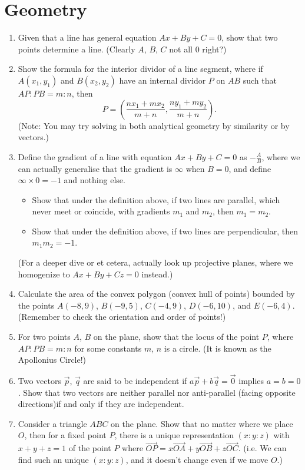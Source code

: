 \documentclass{article}
\begin{document}
\section{Geometry}
\begin{enumerate}
\item Given that a line has general equation $Ax+By+C=0$, show that two points determine a line. (Clearly $A$, $B$, $C$ not all $0$ right?)
\item Show the formula for the interior dividor of a line segment, where if $A(x_1,y_1)$ and $B(x_2,y_2)$ have an internal dividor $P$ on $AB$ such that $AP:PB=m:n$, then \[P=(\frac{nx_1+mx_2}{m+n},\frac{ny_1+my_2}{m+n}).\](Note: You may try solving in both analytical geometry by similarity or by vectors.)
\newpage\noindent
\item Define the gradient of a line with equation $Ax+By+C=0$ as $-\frac{A}{B}$, where we can actually generalise that the gradient is $\infty$ when $B=0$, and define $\infty\times 0=-1$ and nothing else.
       \begin{itemize}
              \item[(a)] Show that under the definition above, if two lines are parallel, which never meet or coincide, with gradients $m_1$ and $m_2$, then $m_1=m_2$.
              \item[(b)] Show that under the definition above, if two lines are perpendicular, then $m_1m_2=-1$.
       \end{itemize} 
(For a deeper dive or et cetera, actually look up projective planes, where we homogenize to $Ax+By+Cz=0$ instead.)
\item Calculate the area of the convex polygon (convex hull of points) bounded by the points $A(-8,9)$, $B(-9,5)$, $C(-4,9)$, $D(-6,10)$, and $E(-6,4)$. (Remember to check the orientation and order of points!)
\item For two points $A$, $B$ on the plane, show that the locus of the point $P$, where $AP:PB=m:n$ for some constants $m$, $n$ is a circle. (It is known as the Apollonius Circle!)
\item Two vectors $\vec{p}$, $\vec{q}$ are said to be independent if $a\vec{p}+b\vec{q}=\vec{0}$ implies $a=b=0$. Show that two vectors are neither parallel nor anti-parallel (facing opposite directions)if and only if they are independent.
\item Consider a triangle $ABC$ on the plane. Show that no matter where we place $O$, then for a fixed point $P$, there is a unique representation $(x:y:z)$ with $x+y+z=1$ of the point $P$ where $\overrightarrow{OP}=x\overrightarrow{OA}+y\overrightarrow{OB}+z\overrightarrow{OC}$. (i.e. We can find such an unique $(x:y:z)$, and it doesn't change even if we move $O$.)

\end{enumerate}
\end{document}
